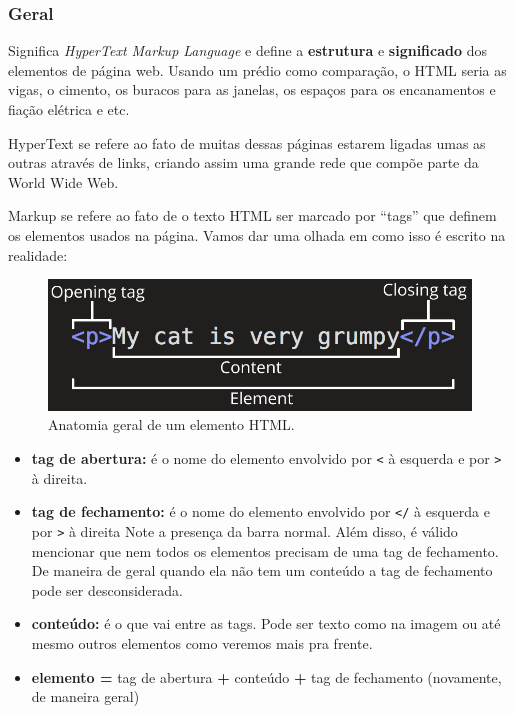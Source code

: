 \subsubsection{Geral}
Significa \textit{HyperText Markup Language} e define a \textbf{estrutura} e \textbf{significado} dos elementos de página web. Usando um prédio como comparação, o HTML seria as vigas, o cimento, os buracos para as janelas, os espaços para os encanamentos e fiação elétrica e etc.

HyperText se refere ao fato de muitas dessas páginas estarem ligadas umas as outras através de links, criando assim uma grande rede que compõe parte da World Wide Web.

Markup se refere ao fato de o texto HTML ser marcado por ``tags'' que definem os elementos usados na página. Vamos dar uma olhada em como isso é escrito na realidade:

\begin{figure}[h!]
    \centering
    \includegraphics[scale=.4]{imgs/element-anatomy.png}
    \caption{Anatomia geral de um elemento HTML.}
    \label{fig:element-anatomy}
\end{figure}


\begin{itemize}
\item
  \textbf{tag de abertura:} é o nome do elemento envolvido por
  \texttt{\textless{}} à esquerda e por \texttt{\textgreater{}} à
  direita.
\item
  \textbf{tag de fechamento:} é o nome do elemento envolvido por
  \texttt{\textless{}/} à esquerda e por \texttt{\textgreater{}} à
  direita Note a presença da barra normal. Além disso, é válido
  mencionar que nem todos os elementos precisam de uma tag de
  fechamento. De maneira de geral quando ela não tem um conteúdo a tag
  de fechamento pode ser desconsiderada.
\item
  \textbf{conteúdo:} é o que vai entre as tags. Pode ser texto como na
  imagem ou até mesmo outros elementos como veremos mais pra frente.
\item
  \textbf{elemento =} tag de abertura \textbf{+} conteúdo \textbf{+} tag
  de fechamento (novamente, de maneira geral)
\end{itemize}

